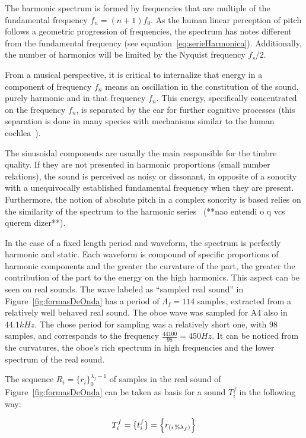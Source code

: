 \documentclass[
 aip,
 jmp,
 amsmath,amssymb,
 reprint,
]{revtex4-1}
\begin{document}
The harmonic spectrum is formed by frequencies that are multiple of the fundamental frequency $f_n=(n+1)f_0$. As the human linear perception of pitch follows  a geometric progression of frequencies, the spectrum has notes different from the fundamental frequency (see equation~\ref{eq:serieHarmonica}). Additionally, the number of harmonics will be limited by the Nyquist frequency $f_s/2$.

From a musical perspective, it is critical to internalize that energy in a component of frequency $f_n$ means an oscillation in the constitution of the sound, purely harmonic and in that frequency $f_n$. This energy, specifically concentrated on the frequency $f_n$, is separated by the ear for further cognitive processes (this separation is done in many species with mechanisms similar to the human cochlea~\cite{Roederer}).

The sinusoidal components are usually the main responsible for the timbre quality. If they are not presented in harmonic proportions (small number relations), the sound is perceived as noisy or dissonant, in opposite of a sonority with a unequivocally established fundamental frequency when they are present. Furthermore, the notion of absolute pitch in a complex sonority is based relies on the similarity of the spectrum to the harmonic series~\cite{Roederer} (**nao entendi o q vcs querem dizer**).

In the case of a fixed length period and waveform, the spectrum is perfectly harmonic and static. Each waveform is compound of specific proportions of harmonic components and the greater the curvature of the part, the greater the contribution of the part to the energy on the high harmonics. This aspect can be seen on real sounds. The wave labeled as ``sampled real sound'' in Figure~\ref{fig:formasDeOnda} has a period of $\Lambda_f=114$ samples, extracted from a relatively well behaved real sound. The oboe wave was sampled for A4 also in $44.1kHz$. The chose period for sampling was a relatively short one, with $98$ samples, and corresponds to the frequency $\frac{44100}{98}=450Hz$. It can be noticed from the curvatures, the oboe's rich spectrum in high frequencies and the lower spectrum of the real sound.

The sequence 
$ R_i=\{ r_i \}_0^{\lambda_f-1}$ of samples in the real sound of Figure~\ref{fig:formasDeOnda} can be taken as basis for a sound $T_i^f$ in the following way: 

\begin{equation}\label{sampleandoFormaDeOnda}
     T^f_i=\{ t_i^f \}=\Bigl\{ r_{(i\,\%\lambda_{f})} \Bigr\}
\end{equation}
\end{document}
